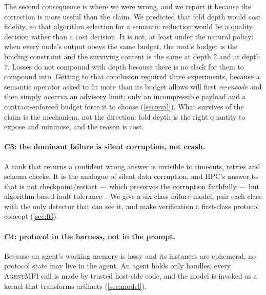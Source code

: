 \documentclass[10pt,twocolumn]{article}
\theoremstyle{definition}
\theoremstyle{plain}
\newcommand{\ampi}{\textsc{AgentMPI}}
\begin{document}
The second consequence is where we were wrong, and we report it because the correction is
more useful than the claim. We predicted that fold depth would cost fidelity, so that
algorithm selection for a semantic reduction would be a quality decision rather than a
cost decision. It is not, at least under the natural policy: when every node's output
obeys the same budget, the root's budget is the binding constraint and the surviving
content is the same at depth 2 and at depth 7. Losses do not compound with depth because
there is no slack for them to compound into. Getting to that conclusion required three
experiments, because a semantic operator asked to fit more than its budget allows will
first \emph{re-encode} and then simply \emph{overrun} an advisory limit; only an
incompressible payload and a contract-enforced budget force it to choose
(\cref{sec:eval}). What survives of the claim is the mechanism, not the direction: fold
depth is the right quantity to expose and minimise, and the reason is cost.

\paragraph{C3: the dominant failure is silent corruption, not crash.} A rank that
returns a confident wrong answer is invisible to timeouts, retries and schema
checks. It is the analogue of silent data corruption, and HPC's answer to that is
not checkpoint/restart --- which preserves the corruption faithfully --- but
algorithm-based fault tolerance~\cite{huang84abft}. We give a six-class failure
model, pair each class with the only detector that can see it, and make
verification a first-class protocol concept (\cref{sec:ft}).

\paragraph{C4: protocol in the harness, not in the prompt.} Because an agent's
working memory is lossy and its instances are ephemeral, no protocol state may
live in the agent. An agent holds only handles; every \ampi{} call is made by
trusted host-side code, and the model is invoked as a kernel that transforms
artifacts (\cref{sec:model}).
\end{document}

